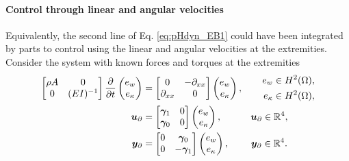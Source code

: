 \paragraph{Control through linear and angular velocities}
Equivalently, the second line of Eq. \eqref{eq:pHdyn_EB1} could have been integrated by parts to control using the linear and angular velocities at the extremities. Consider the system with known forces and torques at the extremities
\begin{subequations}\label{eq:pHlinsys_EB2}
	\begin{align}
	\begin{bmatrix}
	\rho A & 0 \\
	0 &(EI)^{-1} \\
	\end{bmatrix}
	\diffp{}{t}\begin{pmatrix}
	e_w \\ e_\kappa \\
	\end{pmatrix} &= \begin{bmatrix}
	0 & -\partial_{xx} \\
	\partial_{xx} & 0 \\
	\end{bmatrix} \begin{pmatrix}
	e_w \\ e_\kappa \\
	\end{pmatrix}, \qquad \begin{aligned}
	e_w \in H^2(\Omega), \\
	e_\kappa \in H^2(\Omega), \\
	\end{aligned} \label{eq:pHdyn_EB2}\\
	\bm{u}_\partial &= \begin{bmatrix}
	\bm\gamma_{1} & 0\\
	\bm\gamma_{0} & 0 
	\end{bmatrix}
	\begin{pmatrix}
	e_w \\ e_\kappa \\
	\end{pmatrix}, \qquad \quad   \bm{u}_\partial \in \mathbb{R}^4,  \\
	\bm{y}_\partial &= \begin{bmatrix}
	0 &\bm\gamma_{0} \\
	0 &-\bm\gamma_{1} 
	\end{bmatrix} \begin{pmatrix}
	e_w \\ e_\kappa \\
	\end{pmatrix}, \qquad \; \bm{y}_\partial \in \mathbb{R}^4.
	\end{align}
\end{subequations}
